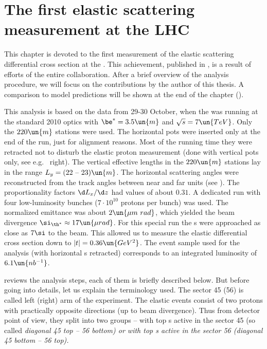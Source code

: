 \chapter[felm]{The first elastic scattering measurement at the LHC}

This chapter is devoted to the first measurement of the elastic scattering differential cross section at the . This achievement, published in , is a result of efforts of the entire  collaboration. After a brief overview of the analysis procedure, we will focus on the contributions by the author of this thesis. A comparison to model predictions will be shown at the end of the chapter ().

This analysis is based on the data from 29-30 October, when the  was running at the standard 2010 optics with $\be^* = 3.5\un{m}$ and $\sqrt s = 7\un{TeV}$. Only the $220\un{m}$ stations were used. The horizontal pots were inserted only at the end of the run, just for alignment reasons. Most of the running time they were retracted not to disturb the elastic proton measurement (done with vertical pots only, see e.g.~ right). The vertical effective lengths in the $220\un{m}$ stations lay in the range $L_y = (22 \hbox{ -- } 23)\un{m}$. The horizontal scattering angles were reconstructed from the track angles between near and far units (see ). The proportionality factors $\d L_{x}/\d z$ had values of about $0.31$. A dedicated run with four low-luminosity bunches ($7\cdot10^{10}$ protons per bunch) was used. The normalized emittance was about $2\un{\mu m\ rad}$, which yielded the beam divergence $\si_{\th^*} \approx 17\un{\mu rad}$. For this special run the s were approached as close as $7\si$ to the beam. This allowed us to measure the elastic differential cross section down to $|t| = 0.36\un{GeV^2}$. The event sample used for the analysis (with horizontal s retracted) corresponds to an integrated luminosity of $6.1\un{nb^{-1}}$.


 reviews the analysis steps, each of them is briefly described below. But before going into details, let us explain the terminology used. The sector 45 (56) is called left (right) arm of the  experiment. The elastic events consist of two protons with practically opposite directions (up to beam divergence). Thus from detector point of view, they split into two groups -- with top s active in the sector 45 (so called \em{diagonal} 45 top -- 56 bottom) or with top s active in the sector 56 (diagonal 45 bottom -- 56 top).

